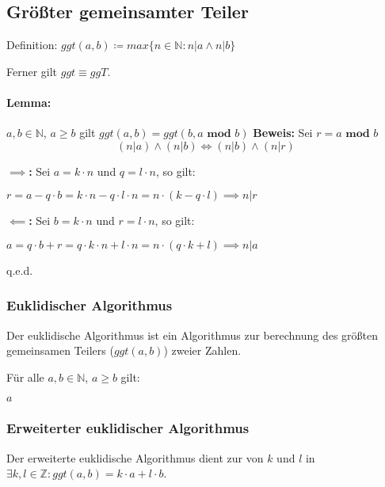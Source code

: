 \documentclass[12pt]{scrreprt}
\newcommand{\lemma}[1]{\paragraph{Lemma:} #1\newline}
\renewcommand{\mod}{\textbf{ mod }}
\newenvironment{proof}
    {\textbf{Beweis:}\newline\indent}
    {\begin{flushright}q.e.d.\end{flushright}}
\begin{document}
            \subsection{Größter gemeinsamter Teiler}
                Definition: $ ggt(a, b) \coloneqq max \{ n \in \mathbb{N} : n \vert a \land n \vert b \} $

                Ferner gilt $ ggt \equiv ggT $.

                \lemma{$ a, b \in \mathbb{N} $, $ a \geq b $ gilt $ ggt(a, b) = ggt(b, a \mod b) $}
                \begin{proof}
                    Sei $ r = a \mod b $
                    \[ (n \vert a) \land (n \vert b) \iff (n \vert b) \land (n \vert r) \]

                    \textbf{$ \implies $: } Sei $ a = k \cdot n $ und $ q = l \cdot n $, so gilt:

                    $ r = a - q \cdot b = k \cdot n - q \cdot l \cdot n = n \cdot (k - q \cdot l) \implies n \vert r $

                    \vspace{10px}

                    \textbf{$ \impliedby $: } Sei $ b = k \cdot n $ und $ r = l \cdot n $, so gilt:

                    $ a = q \cdot b + r = q \cdot k \cdot n + l \cdot n = n \cdot (q \cdot k + l) \implies n \vert a $
                \end{proof}


                \subsubsection{Euklidischer Algorithmus}
                    Der euklidische Algorithmus ist ein Algorithmus zur berechnung des größten gemeinsamen Teilers ($ ggt(a, b) $) zweier Zahlen.

                    Für alle $ a, b \in \mathbb{N} $, $ a \geq b $ gilt:
                    \begin{algorithmic}
                                \State \Return $ a $
                            \Else
                                \State \Return \Call{ggt}{$ b $, $ a \mod b $}
                            \EndIf
                        \EndFunction
                    \end{algorithmic}


                \subsubsection{Erweiterter euklidischer Algorithmus}
                    Der erweiterte euklidische Algorithmus dient zur von $ k $ und $ l $ in $ \exists k, l \in \mathbb{Z} : ggt(a, b) = k \cdot a + l \cdot b $.
\end{document}
